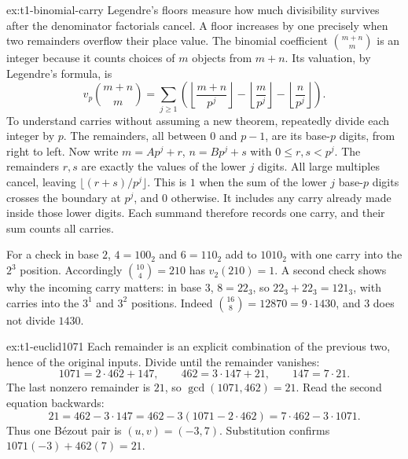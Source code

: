 \begin{solution}{ex:t1-binomial-carry}
\idea Legendre's floors measure how much divisibility survives after the denominator factorials cancel. A floor increases by one precisely when two remainders overflow their place value.
\writeup The binomial coefficient $\binom{m+n}{m}$ is an integer because it counts choices of $m$ objects from $m+n$. Its valuation, by Legendre's formula, is
\[
v_p\binom{m+n}{m}
=\sum_{j\ge1}\left(
\left\lfloor\frac{m+n}{p^j}\right\rfloor-
\left\lfloor\frac m{p^j}\right\rfloor-
\left\lfloor\frac n{p^j}\right\rfloor\right).
\]
To understand carries without assuming a new theorem, repeatedly divide each integer by $p$. The remainders, all between $0$ and $p-1$, are its base-$p$ digits, from right to left. Now write $m=Ap^j+r$, $n=Bp^j+s$ with $0\le r,s<p^j$. The remainders $r,s$ are exactly the values of the lower $j$ digits. All large multiples cancel, leaving $\lfloor(r+s)/p^j\rfloor$. This is $1$ when the sum of the lower $j$ base-$p$ digits crosses the boundary at $p^j$, and $0$ otherwise. It includes any carry already made inside those lower digits. Each summand therefore records one carry, and their sum counts all carries.

For a check in base $2$, $4=100_2$ and $6=110_2$ add to $1010_2$ with one carry into the $2^3$ position. Accordingly $\binom{10}4=210$ has $v_2(210)=1$. A second check shows why the incoming carry matters: in base $3$, $8=22_3$, so $22_3+22_3=121_3$, with carries into the $3^1$ and $3^2$ positions. Indeed $\binom{16}8=12870=9\cdot1430$, and $3$ does not divide $1430$.
\end{solution}

\begin{solution}{ex:t1-euclid1071}
\idea Each remainder is an explicit combination of the previous two, hence of the original inputs.
\writeup Divide until the remainder vanishes:
\[
1071=2\cdot462+147,\qquad
462=3\cdot147+21,\qquad
147=7\cdot21.
\]
The last nonzero remainder is $21$, so $\gcd(1071,462)=21$. Read the second equation backwards:
\[
21=462-3\cdot147
=462-3(1071-2\cdot462)
=7\cdot462-3\cdot1071.
\]
Thus one B\'ezout pair is $(u,v)=(-3,7)$. Substitution confirms $1071(-3)+462(7)=21$.
\end{solution}

